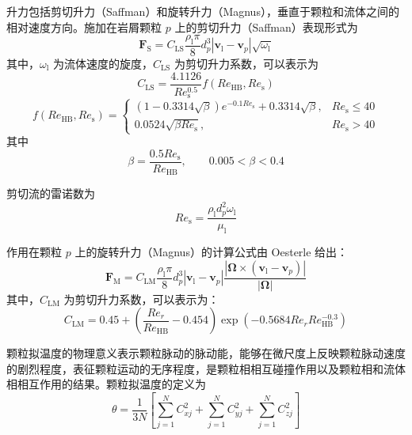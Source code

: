 升力包括剪切升力（Saffman）和旋转升力（Magnus），垂直于颗粒和流体之间的相对速度方向。施加在岩屑颗粒 \(p\) 上的剪切升力（Saffman）表现形式为
\begin{equation}
	\bm{F}_{\mathrm{S}}
	=C_{\mathrm{LS}}\frac{\rho_{\mathrm{l}}\pi}{8}d_{p}^{3}
	\left|\bm{v}_{\mathrm{l}}-\bm{v}_{p}\right|
	\sqrt{\omega_{\mathrm{l}}}
\end{equation}
其中，\(\omega_{\mathrm{l}}\) 为流体速度的旋度，\(C_{\mathrm{LS}}\) 为剪切升力系数，可以表示为
\begin{equation}
	C_{\mathrm{LS}}=\frac{4.1126}{Re_{\mathrm{s}}^{0.5}}f\left(Re_{\mathrm{HB}},Re_{\mathrm{s}}\right)
\end{equation}
\begin{equation}
	f\left(Re_{\mathrm{HB}},Re_{\mathrm{s}}\right)
	=
	\begin{cases}
		\left(1-0.3314\sqrt{\beta}\right)
		e^{-0.1Re_{\mathrm{s}}}
		+0.3314\sqrt{\beta}, & Re_{\mathrm{s}}\leq 40 \\[6pt]
		0.0524\sqrt{\beta Re_{\mathrm{s}}}, & Re_{\mathrm{s}}>40
	\end{cases}
\end{equation}
其中
\begin{equation}
	\beta=\frac{0.5Re_{\mathrm{s}}}{Re_{\mathrm{HB}}},\qquad 0.005<\beta<0.4
\end{equation}

剪切流的雷诺数为
\begin{equation}
	Re_{\mathrm{s}}=\frac{\rho_{\mathrm{l}}d_{p}^{2}\omega_{\mathrm{l}}}{\mu_{\mathrm{l}}}
\end{equation}

作用在颗粒 \(p\) 上的旋转升力（Magnus）的计算公式由 Oesterle 给出：
\begin{equation}
	\bm{F}_{\mathrm{M}}
	=C_{\mathrm{LM}}\frac{\rho_{\mathrm{l}}\pi}{8}d_{p}^{3}
	\left|\bm{v}_{\mathrm{l}}-\bm{v}_{p}\right|
	\frac{\left|\bm{\Omega}\times
		\left(\bm{v}_{\mathrm{l}}-\bm{v}_{p}\right)\right|}
	{\left|\bm{\Omega}\right|}
\end{equation}
其中，\(C_{\mathrm{LM}}\) 为剪切升力系数，可以表示为：
\begin{equation}
	C_{\mathrm{LM}}
	=0.45+\left(\frac{Re_{r}}{Re_{\mathrm{HB}}}-0.454\right)
	\exp\left(-0.5684Re_{r}Re_{\mathrm{HB}}^{-0.3}\right)
\end{equation}

颗粒拟温度的物理意义表示颗粒脉动的脉动能，能够在微尺度上反映颗粒脉动速度的剧烈程度，表征颗粒运动的无序程度，是颗粒相相互碰撞作用以及颗粒相和流体相相互作用的结果。颗粒拟温度的定义为
\begin{equation}
	\theta=\frac{1}{3N}\left[
	\sum_{j=1}^{N}C_{xj}^{2}
	+\sum_{j=1}^{N}C_{yj}^{2}
	+\sum_{j=1}^{N}C_{zj}^{2}
	\right]
\end{equation}


